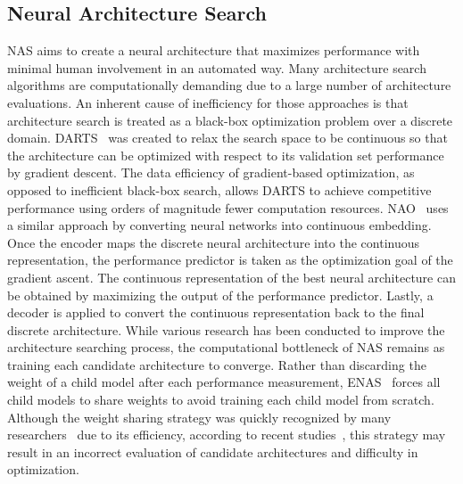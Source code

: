 \documentclass{article}
\begin{document}
\subsection{Neural Architecture Search}
NAS aims to create a neural architecture that maximizes performance with minimal human involvement in an automated way. Many architecture search algorithms are computationally demanding due to a large number of architecture evaluations. An inherent cause of inefficiency for those approaches is that architecture search is treated as a black-box optimization problem over a discrete domain. DARTS~\cite{DARTS} was created to relax the search space to be continuous so that the architecture can be optimized with respect to its validation set performance by gradient descent. The data efficiency of gradient-based optimization, as opposed to inefficient black-box search, allows DARTS to achieve competitive performance using orders of magnitude fewer computation resources. NAO~\cite{NAO} uses a similar approach by converting neural networks into continuous embedding. Once the encoder maps the discrete neural architecture into the continuous representation, the performance predictor is taken as the optimization goal of the gradient ascent. The continuous representation of the best neural architecture can be obtained by maximizing the output of the performance predictor. Lastly, a decoder is applied to convert the continuous representation back to the final discrete architecture. While various research has been conducted to improve the architecture searching process, the computational bottleneck of NAS remains as training each candidate architecture to converge. Rather than discarding the weight of a child model after each performance measurement, ENAS~\cite{ENAS} forces all child models to share weights to avoid training each child model from scratch. Although the weight sharing strategy was quickly recognized by many researchers~\cite{SMASH, AutoGAN, ContinualAndMultiTask} due to its efficiency, according to recent studies~\cite{evaluate_NAS}, this strategy may result in an incorrect evaluation of candidate architectures and difficulty in optimization. 
\end{document}
